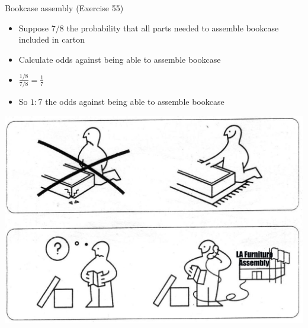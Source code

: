 \documentclass{beamer}
\theoremstyle{definition}
\begin{document}
\begin{frame}{Bookcase assembly (Exercise 55)}
\begin{multicols}{2}
\begin{itemize}
\item Suppose $7/8$ the probability that
all parts needed to assemble bookcase included in carton
\item Calculate odds against being able to assemble bookcase
\item $\frac{1/8}{7/8}=\frac{1}{7}$
\columnbreak
\item So $1:7$ the odds against being able to assemble bookcase
\end{itemize}
\includegraphics[scale=.15]{Ikea}
\end{multicols}
\end{frame}
\end{document}
